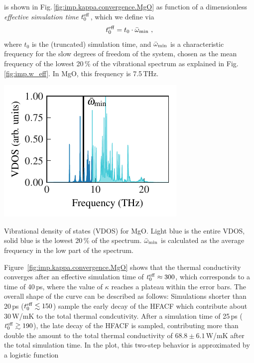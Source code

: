  is shown in Fig.\,\ref{fig:imp.kappa.convergence.MgO} as function of a dimensionless \emph{effective simulation time} $t_0^{\rm eff}$, which we define via
\begin{align}
	t^{\rm eff}_0 = t_0 \cdot \bar{\omega}_{\rm min}~,
	\label{eq:imp.teff}
\end{align}
where $t_0$ is the (truncated) simulation time, and $\bar{\omega}_{\rm min}$ is a characteristic frequency for the slow degrees of freedom of the system, chosen as the mean frequency of the lowest 20\,\% of the vibrational spectrum as explained in Fig.\,\ref{fig:imp.w_eff}. In MgO, this frequency is 7.5\,THz.
\begin{marginfigure}
	\includegraphics[width=\textwidth]{./data/plots/kappa_convergence/t_eff/vdos.pdf}
	\caption{Vibrational density of states (VDOS) for MgO. Light blue is the entire VDOS, solid blue is the lowest 20\,\% of the spectrum. $\bar{\omega}_{\rm min}$ is calculated as the average frequency in the low part of the spectrum.}
	\label{fig:imp.w_eff}
\end{marginfigure}
Figure~\ref{fig:imp.kappa.convergence.MgO} shows that the thermal conductivity converges after an effective simulation time of $t^{\rm eff}_0 \approx 300$, which corresponds to a time of 40\,ps, where the value of $\kappa$ reaches a plateau within the error bars. The overall shape of the curve can be described as follows: Simulations shorter than 20\,ps ($t^{\rm eff}_0 \lesssim 150$) sample the early decay of the HFACF which contribute about 30\,W/mK to the total thermal condcutivity. After a simulation time of 25\,ps ($t^{\rm eff}_0 \gtrsim 190$), the late decay of the HFACF is sampled, contributing more than double the amount to the total thermal conductivity of $68.8 \pm 6.1$\,W/mK after the total simulation time. In the plot, this two-step behavior is approximated by a logistic function 
